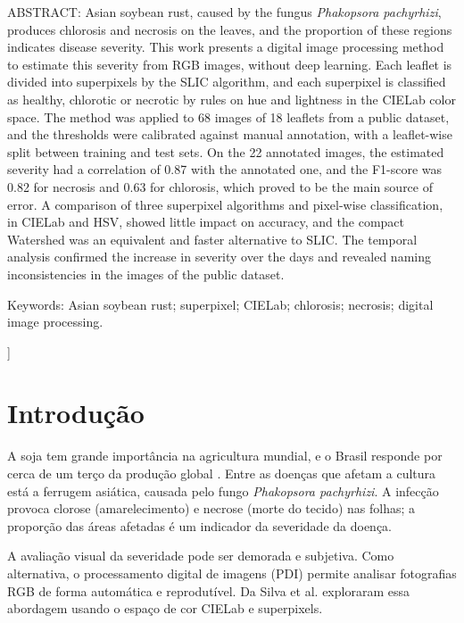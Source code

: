 \documentclass[10pt,a4paper,twocolumn]{article}
\begin{document}
{\vspace{8pt}
ABSTRACT: Asian soybean rust, caused by the fungus \textit{Phakopsora
pachyrhizi}, produces chlorosis and necrosis on the leaves, and the
proportion of these regions indicates disease severity. This work
presents a digital image processing method to estimate this severity
from RGB images, without deep learning. Each leaflet is divided into
superpixels by the SLIC algorithm, and each superpixel is classified as
healthy, chlorotic or necrotic by rules on hue and lightness in the
CIELab color space. The method was applied to 68 images of 18 leaflets
from a public dataset, and the thresholds were calibrated against manual
annotation, with a leaflet-wise split between training and test sets. On
the 22 annotated images, the estimated severity had a correlation of
0.87 with the annotated one, and the F1-score was 0.82 for necrosis and
0.63 for chlorosis, which proved to be the main source of error. A
comparison of three superpixel algorithms and pixel-wise classification,
in CIELab and HSV, showed little impact on accuracy, and the compact
Watershed was an equivalent and faster alternative to SLIC. The temporal
analysis confirmed the increase in severity over the days and revealed
naming inconsistencies in the images of the public dataset.

\vspace{4pt}
Keywords: Asian soybean rust; superpixel; CIELab; chlorosis; necrosis; digital image processing.
\vspace{14pt}
}]

\section{Introdução}

A soja tem grande importância na agricultura mundial, e o Brasil
responde por cerca de um terço da produção global \cite{dasilva2022}.
Entre as doenças que afetam a cultura está a ferrugem asiática, causada
pelo fungo \textit{Phakopsora pachyrhizi}. A infecção provoca clorose
(amarelecimento) e necrose (morte do tecido) nas folhas; a proporção das
áreas afetadas é um indicador da severidade da doença.

A avaliação visual da severidade pode ser demorada e subjetiva. Como
alternativa, o processamento digital de imagens (PDI) permite analisar
fotografias RGB de forma automática e reprodutível. Da Silva et al.
\cite{dasilva2022} exploraram essa abordagem usando o espaço de cor
CIELab e superpixels.
\end{document}
